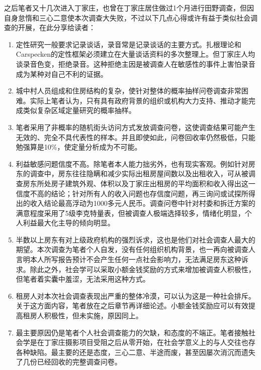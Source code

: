   之后笔者又十几次进入丁家庄，也曾在丁家庄居住做过1个月进行田野调查，但因自身怠惰和三心二意使本次调查大失败，不过以下几点心得或许有益于类似社会调查的开展，在此分享给读者：
  \begin{enumerate}
    
  \item 定性研究一般要求记录谈话，录音常是记录谈话的主要方式。扎根理论和Carspecken的定性框架必须建立在大量谈话资料的多次整理上。但丁家庄人均谈录音色变，拒绝录音。这种拒绝主因是被调查人在敏感性的事件上害怕录音成为某种对自己不利的证据。

  \item 城中村人员组成和住房结构的复杂，使针对整体的概率抽样问卷调查非常困难。实际上笔者认为，只有具有政府背景的组织或机构大力支持、推动才能完成类似复杂区域定量研究的概率抽样。

  \item 笔者采用了非概率的随机街头访问方式发放调查问卷，这使调查结果可能产生无效的、完全不具代表性的样本。并且即使如此，问卷回收率仍然极低，只能勉强算是10\%，使定量分析成为不可能。

  \item 利益敏感问题信度不高。除笔者本人能力拙劣外，也有现实客观。例如针对房东的调查中，房东往往隐瞒和减少实际出租房屋间数以及出租收入，可从被调查房东所处房子建筑外观、体积以及丁家庄出租房的平均面积和收入得出这一信度不高的结论；针对所有人的收入问题也存信度问题，再三询问或试探所得出的收入结论最高浮动为1000多元人民币。调查问卷中针对村委和拆迁方案的满意程度采用了5级李克特量表，但被调查人极端选择较多，情绪化明显，个人利益最大化主导的倾向明显。

  \item 半数以上房东有对上级政府机构的强烈诉求，这也是他们对社会调查人最大的期望。本次调查为笔者个人自发，没有任何组织机构背景，也一再向被调查人言明本人所写报告预计不会产生任何一点社会影响力，无法满足房东这种诉求。除此之外，社会学可以采取小额金钱奖励的方式来增加被调查人积极性，但笔者着实囊中羞涩，无法采用这种方式。

  \item 租房人对本次社会调查表现出严重的整体冷漠，可以认为这是一种社会排斥。关于这方面内容，笔者放在之后章节再详细论述。小额金钱奖励应可以有效提高租房人积极性，但未实施，原因同上。

  \item 最主要原因仍是笔者个人社会调查能力的欠缺，和态度的不端正。笔者接触社会学是在丁家庄摄影项目受阻之后从零开始，在社会学意义上的与人交往也存各种缺陷。最主要的还是态度，三心二意、半途而废，甚至因屡次消沉而遗失了几份已经回收的完整调查问卷。

  \end{enumerate}

